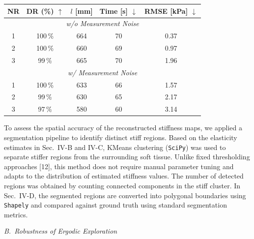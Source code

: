 \documentclass[11pt]{article}
\begin{document}
\begin{center}
\small
\begin{tabular}{c c c c c}
\toprule
NR & DR (\%) $\uparrow$ & $l$ [mm] & Time [s] $\downarrow$ & RMSE [kPa] $\downarrow$ \\
\midrule
\multicolumn{5}{c}{\textit{w/o Measurement Noise}} \\
\midrule
1 & 100\,\% & 664 & 70 & 0.37 \\
2 & 100\,\% & 660 & 69 & 0.97 \\
3 & 99\,\%  & 665 & 70 & 1.96 \\
\midrule
\multicolumn{5}{c}{\textit{w/\phantom{o} Measurement Noise}} \\
\midrule
1 & 100\,\% & 633 & 66 & 1.57 \\
2 & 99\,\%  & 630 & 65 & 2.17 \\
3 & 97\,\%  & 580 & 60 & 3.14 \\
\bottomrule
\end{tabular}
\end{center}

\vspace{0.6em}

\noindent
To assess the spatial accuracy of the reconstructed stiffness maps,
we applied a segmentation pipeline to identify distinct stiff
regions. Based on the elasticity estimates in Sec.~IV-B and IV-C,
KMeans clustering (\texttt{SciPy}) was used to separate stiffer
regions from the surrounding soft tissue. Unlike fixed thresholding
approaches [12], this method does not require manual parameter
tuning and adapts to the distribution of estimated stiffness values.
The number of detected regions was obtained by counting connected
components in the stiff cluster. In Sec.~IV-D, the segmented regions
are converted into polygonal boundaries using \texttt{Shapely} and
compared against ground truth using standard segmentation metrics.

\vspace{0.6em}

\noindent\textit{B.~Robustness of Ergodic Exploration}

\vspace{0.2em}
\end{document}
